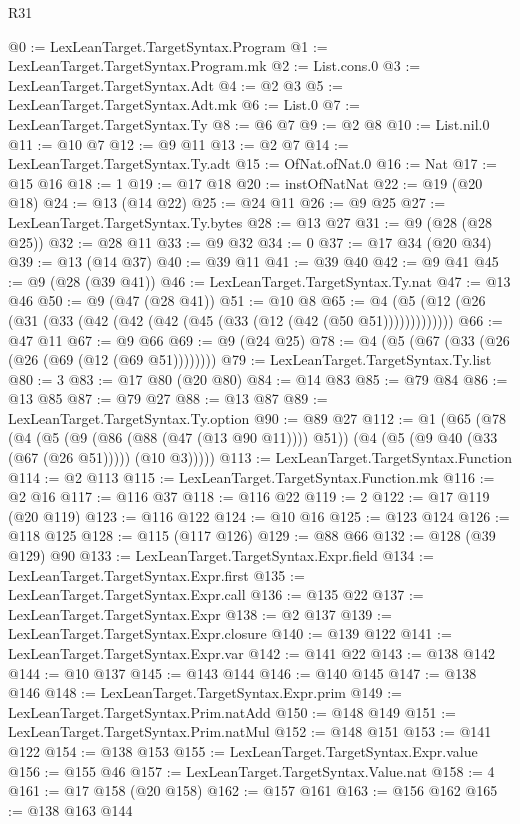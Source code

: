 \begin{lexlean}{R31}
\begin{coremodule}
@0 := LexLeanTarget.TargetSyntax.Program
@1 := LexLeanTarget.TargetSyntax.Program.mk
@2 := List.cons.{0}
@3 := LexLeanTarget.TargetSyntax.Adt
@4 := @2 @3
@5 := LexLeanTarget.TargetSyntax.Adt.mk
@6 := List.{0}
@7 := LexLeanTarget.TargetSyntax.Ty
@8 := @6 @7
@9 := @2 @8
@10 := List.nil.{0}
@11 := @10 @7
@12 := @9 @11
@13 := @2 @7
@14 := LexLeanTarget.TargetSyntax.Ty.adt
@15 := OfNat.ofNat.{0}
@16 := Nat
@17 := @15 @16
@18 := 1
@19 := @17 @18
@20 := instOfNatNat
@22 := @19 (@20 @18)
@24 := @13 (@14 @22)
@25 := @24 @11
@26 := @9 @25
@27 := LexLeanTarget.TargetSyntax.Ty.bytes
@28 := @13 @27
@31 := @9 (@28 (@28 @25))
@32 := @28 @11
@33 := @9 @32
@34 := 0
@37 := @17 @34 (@20 @34)
@39 := @13 (@14 @37)
@40 := @39 @11
@41 := @39 @40
@42 := @9 @41
@45 := @9 (@28 (@39 @41))
@46 := LexLeanTarget.TargetSyntax.Ty.nat
@47 := @13 @46
@50 := @9 (@47 (@28 @41))
@51 := @10 @8
@65 := @4 (@5 (@12 (@26 (@31 (@33 (@42 (@42 (@42 (@45 (@33 (@12 (@42 (@50 @51)))))))))))))
@66 := @47 @11
@67 := @9 @66
@69 := @9 (@24 @25)
@78 := @4 (@5 (@67 (@33 (@26 (@26 (@69 (@12 (@69 @51))))))))
@79 := LexLeanTarget.TargetSyntax.Ty.list
@80 := 3
@83 := @17 @80 (@20 @80)
@84 := @14 @83
@85 := @79 @84
@86 := @13 @85
@87 := @79 @27
@88 := @13 @87
@89 := LexLeanTarget.TargetSyntax.Ty.option
@90 := @89 @27
@112 := @1
    (@65
      (@78
        (@4
          (@5 (@9 (@86 (@88 (@47 (@13 @90 @11)))) @51))
          (@4 (@5 (@9 @40 (@33 (@67 (@26 @51))))) (@10 @3)))))
@113 := LexLeanTarget.TargetSyntax.Function
@114 := @2 @113
@115 := LexLeanTarget.TargetSyntax.Function.mk
@116 := @2 @16
@117 := @116 @37
@118 := @116 @22
@119 := 2
@122 := @17 @119 (@20 @119)
@123 := @116 @122
@124 := @10 @16
@125 := @123 @124
@126 := @118 @125
@128 := @115 (@117 @126)
@129 := @88 @66
@132 := @128 (@39 @129) @90
@133 := LexLeanTarget.TargetSyntax.Expr.field
@134 := LexLeanTarget.TargetSyntax.Expr.first
@135 := LexLeanTarget.TargetSyntax.Expr.call
@136 := @135 @22
@137 := LexLeanTarget.TargetSyntax.Expr
@138 := @2 @137
@139 := LexLeanTarget.TargetSyntax.Expr.closure
@140 := @139 @122
@141 := LexLeanTarget.TargetSyntax.Expr.var
@142 := @141 @22
@143 := @138 @142
@144 := @10 @137
@145 := @143 @144
@146 := @140 @145
@147 := @138 @146
@148 := LexLeanTarget.TargetSyntax.Expr.prim
@149 := LexLeanTarget.TargetSyntax.Prim.natAdd
@150 := @148 @149
@151 := LexLeanTarget.TargetSyntax.Prim.natMul
@152 := @148 @151
@153 := @141 @122
@154 := @138 @153
@155 := LexLeanTarget.TargetSyntax.Expr.value
@156 := @155 @46
@157 := LexLeanTarget.TargetSyntax.Value.nat
@158 := 4
@161 := @17 @158 (@20 @158)
@162 := @157 @161
@163 := @156 @162
@165 := @138 @163 @144

\end{coremodule}
\end{lexlean}
